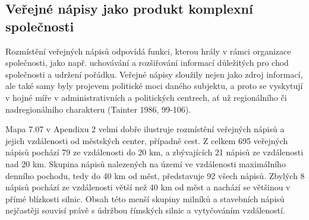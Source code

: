 
\subsection[veřejné-nápisy-jako-produkt-komplexní-společnosti]{Veřejné nápisy jako produkt komplexní společnosti}

Rozmístění veřejných nápisů odpovídá funkci, kterou hrály v rámci organizace společnosti, jako např. uchovávání a rozšiřování informací důležitých pro chod společnosti a udržení pořádku. Veřejné nápisy sloužily nejen jako zdroj informací, ale také samy byly projevem politické moci daného subjektu, a proto se vyskytují v hojné míře v administrativních a politických centrech, ať už regionálního či nadregionálního charakteru (Tainter 1986, 99-106).

Mapa 7.07 v Apendixu 2 velmi dobře ilustruje rozmístění veřejných nápisů a jejich vzdálenosti od městských center, případně cest. Z celkem 695 veřejných nápisů pochází 79  ze vzdálenosti do 20 km, a zbývajících 21  nápisů ze vzdálenosti nad 20 km. Skupina nápisů nalezených na území ve vzdálenosti maximálního denního pochodu, tedy do 40 km od měst, představuje 92  všech nápisů. Zbylých 8  nápisů pochází ze vzdálenosti větší než 40 km od měst a nachází se většinou v přímé blízkosti silnic. Obsah této menší skupiny milníků a stavebních nápisů nejčastěji souvisí právě s údržbou římských silnic a vytyčováním vzdáleností.\crlf
